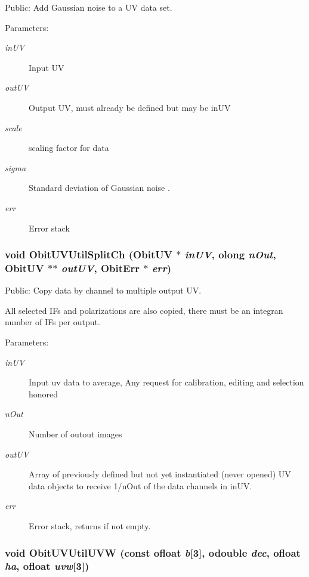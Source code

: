 Public: Add Gaussian noise to a UV data set. 

\begin{Desc}
\item[Parameters:]
\begin{description}
\item[{\em in\-UV}]Input UV \item[{\em out\-UV}]Output UV, must already be defined but may be in\-UV \item[{\em scale}]scaling factor for data \item[{\em sigma}]Standard deviation of Gaussian noise . \item[{\em err}]Error stack \end{description}
\end{Desc}
\subsubsection{\setlength{\rightskip}{0pt plus 5cm}void Obit\-UVUtil\-Split\-Ch ({\bf Obit\-UV} $\ast$ {\em in\-UV}, {\bf olong} {\em n\-Out}, {\bf Obit\-UV} $\ast$$\ast$ {\em out\-UV}, {\bf Obit\-Err} $\ast$ {\em err})}\label{ObitUVUtil_8h_a10}


Public: Copy data by channel to multiple output UV. 

All selected IFs and polarizations are also copied, there must be an integran number of IFs per output. \begin{Desc}
\item[Parameters:]
\begin{description}
\item[{\em in\-UV}]Input uv data to average, Any request for calibration, editing and selection honored \item[{\em n\-Out}]Number of outout images \item[{\em out\-UV}]Array of previously defined but not yet instantiated (never opened) UV data objects to receive 1/n\-Out of the data channels in in\-UV. \item[{\em err}]Error stack, returns if not empty. \end{description}
\end{Desc}
\subsubsection{\setlength{\rightskip}{0pt plus 5cm}void Obit\-UVUtil\-UVW (const {\bf ofloat} {\em b}[3], {\bf odouble} {\em dec}, {\bf ofloat} {\em ha}, {\bf ofloat} {\em uvw}[3])}\label{ObitUVUtil_8h_a13}


